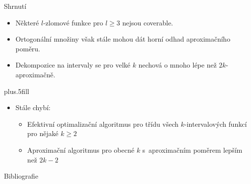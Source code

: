 \documentclass{beamer}
\theoremstyle{remark}
\begin{document}
\begin{frame}{Shrnutí}

  \begin{itemize}
  \item
    Některé $l$-zlomové funkce pro $l \geq 3$ nejsou coverable.
  \item
    Ortogonální množiny však stále mohou dát horní odhad aproximačního poměru.
  \item
    Dekompozice na intervaly se pro velké $k$ nechová o mnoho lépe než $2k$-aproximačně.
  \end{itemize}
  
  \vskip0pt plus.5fill
  \begin{itemize}
  \item
    Stále chybí:
    \begin{itemize}
    \item
      Efektivní optimalizační algoritmus pro třídu všech $k$-intervalových funkcí pro nějaké $k \geq 2$
    \item
      Aproximační algoritmus pro obecné $k$ s~aproximačním poměrem lepším než $2k-2$
    \end{itemize}
  \end{itemize}
\end{frame}

\begin{frame}{Bibliografie}



\end{frame}
\end{document}
